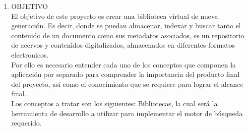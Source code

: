 \begin{enumerate}[1.]
\item OBJETIVO
\\ El objetivo de este proyecto es crear una biblioteca virtual de nueva generación.
Es decir, donde se puedan almacenar, indexar y buscar tanto el contenido de un documento como sus metadatos asociados, es un repositorio de acervos y contenidos digitalizados, almacenados en diferentes formatos electronicos.
\\ Por ello es necesario entender cada uno de los conceptos que componen la aplicación por separado para comprender la importancia 	del producto final del 	proyecto, así como el conocimiento que se requiere para lograr el alcance final.
\\ Los conceptos a tratar son los siguientes: Bibliotecas, la cual será la herramienta de desarrollo a utilizar para implementar el 	motor de búsqueda requerido. 


\end{enumerate} 
